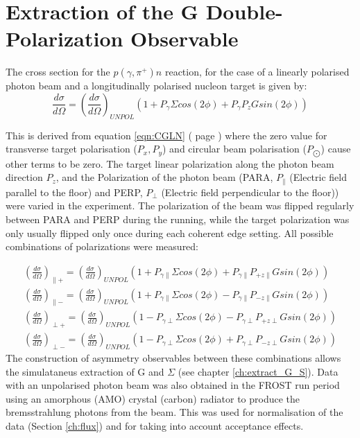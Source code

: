 \section{Extraction of the G Double-Polarization Observable} \label{ch:extract_G}
The cross section for the $p(\gamma,\pi^+)n$ reaction, for the case of a linearly polarised photon beam and a longitudinally polarised nucleon target is given by:
\begin{equation}
  \frac{d\sigma}{d\Omega} = \left(\frac{d\sigma}{d\Omega}\right)_{UNPOL}  \left( 1 + P_{\gamma}\Sigma cos(2\phi) + P_{\gamma} P_z G sin(2\phi) \right)
  \label{eqn:extract_G_S}
\end{equation}

This is derived from equation \ref{eqn:CGLN} ( page \pageref{eqn:CGLN}) where the zero value for transverse target polarisation ($P_x , P_y$) and circular beam polarisation ($P_{\bigodot}$) cause other terms to be zero. The target linear polarization along the photon beam direction $P_z$, and the Polarization of the photon beam (PARA, $P_{\parallel}$ (Electric field parallel to the floor) and PERP, $P_{\perp}$ (Electric field perpendicular to the floor)) were varied in the experiment. The polarization of the beam was flipped regularly between PARA and PERP during the running, while the target polarization was only usually flipped only once during each coherent edge setting. All possible combinations of polarizations were measured:

\begin{eqnarray}
\left(\frac{d\sigma}{d\Omega}\right)_{\parallel +} = \left(\frac{d\sigma}{d\Omega}\right)_{UNPOL}  \left( 1 + P_{\gamma \parallel}\Sigma cos(2\phi) + P_{\gamma \parallel} P_{+z\parallel} G sin(2\phi) \right) \\
\left(\frac{d\sigma}{d\Omega}\right)_{\parallel -} = \left(\frac{d\sigma}{d\Omega}\right)_{UNPOL}  \left( 1 + P_{\gamma \parallel}\Sigma cos(2\phi) - P_{\gamma \parallel} P_{-z\parallel} G sin(2\phi) \right) \\
\left(\frac{d\sigma}{d\Omega}\right)_{\perp +} = \left(\frac{d\sigma}{d\Omega}\right)_{UNPOL}  \left( 1 - P_{\gamma \perp}\Sigma cos(2\phi) - P_{\gamma \perp} P_{+z\perp} G sin(2\phi) \right) \\
\left(\frac{d\sigma}{d\Omega}\right)_{\perp -} = \left(\frac{d\sigma}{d\Omega}\right)_{UNPOL}  \left( 1 - P_{\gamma \perp}\Sigma cos(2\phi) + P_{\gamma \perp} P_{-z\perp} G sin(2\phi) \right)
\end{eqnarray}
The construction of asymmetry observables between these combinations allows the simulataneus extraction of G and $\Sigma$ (see chapter \ref{ch:extract_G_S}). Data with an unpolarised photon beam was also obtained in the FROST run period using an amorphous (AMO) crystal (carbon) radiator to produce the bremsstrahlung photons from the beam. This was used for normalisation of the data (Section \ref{ch:flux}) and for taking into account acceptance effects. 

